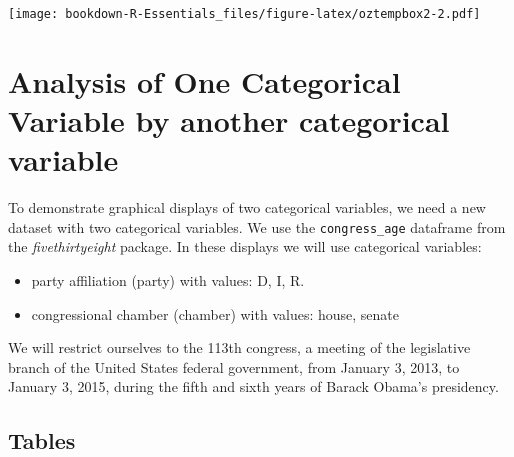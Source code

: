 \documentclass[
]{book}
\newenvironment{Shaded}{\begin{snugshade}}{\end{snugshade}}
\newcommand{\CommentTok}[1]{\textcolor[rgb]{0.56,0.35,0.01}{\textit{#1}}}
\newcommand{\DataTypeTok}[1]{\textcolor[rgb]{0.13,0.29,0.53}{#1}}
\newcommand{\DecValTok}[1]{\textcolor[rgb]{0.00,0.00,0.81}{#1}}
\newcommand{\KeywordTok}[1]{\textcolor[rgb]{0.13,0.29,0.53}{\textbf{#1}}}
\newcommand{\NormalTok}[1]{#1}
\newcommand{\OperatorTok}[1]{\textcolor[rgb]{0.81,0.36,0.00}{\textbf{#1}}}
\newcommand{\StringTok}[1]{\textcolor[rgb]{0.31,0.60,0.02}{#1}}
\providecommand{\tightlist}{%
  \setlength{\itemsep}{0pt}\setlength{\parskip}{0pt}}
\begin{document}
\texttt{[image: bookdown-R-Essentials\_files/figure-latex/oztempbox2-2.pdf]}

\hypertarget{analysis-of-one-categorical-variable-by-another-categorical-variable}{%
\chapter{Analysis of One Categorical Variable by another categorical variable}\label{analysis-of-one-categorical-variable-by-another-categorical-variable}}

To demonstrate graphical displays of two categorical variables, we need a new dataset with two categorical variables. We use the \texttt{congress\_age} dataframe from the \emph{fivethirtyeight} package. In these displays we will use categorical variables:

\begin{itemize}
\tightlist
\item
  party affiliation (party) with values: D, I, R.
\item
  congressional chamber (chamber) with values: house, senate
\end{itemize}

We will restrict ourselves to the 113th congress, a meeting of the legislative branch of the United States federal government, from January 3, 2013, to January 3, 2015, during the fifth and sixth years of Barack Obama's presidency.

\hypertarget{tables}{%
\section{Tables}\label{tables}}

\begin{Shaded}
\end{Shaded}
\end{document}

